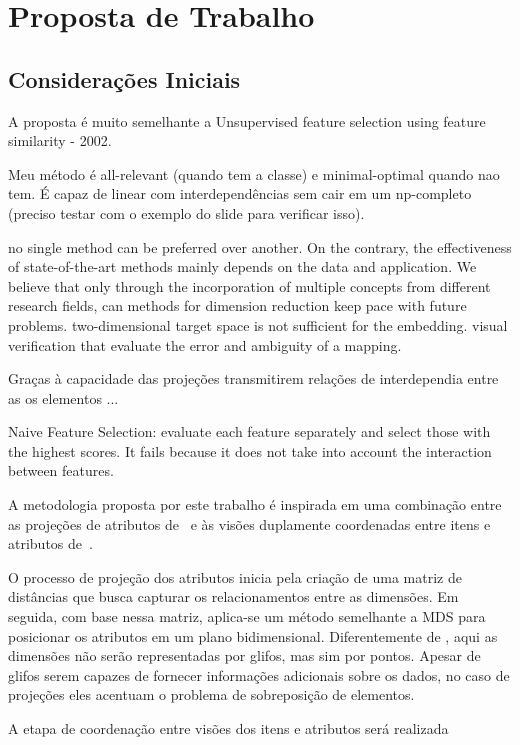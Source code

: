 \chapter{Proposta de Trabalho}\label{chap:proposta}

\section{Considerações Iniciais}

A proposta é muito semelhante a Unsupervised feature selection using feature similarity - 2002.

Meu método é all-relevant (quando tem a classe) e minimal-optimal quando nao tem. É capaz de linear com interdependências sem cair em um np-completo (preciso testar com o exemplo do slide para verificar isso).

\cite{Engel2012} no single method can be preferred over another. On the contrary, the effectiveness of state-of-the-art methods mainly depends on the data and application. 
We believe that only through the incorporation of multiple concepts from different research fields, can methods for dimension reduction keep pace with future problems. two-dimensional target space is not sufficient for the embedding. visual verification that evaluate the error and ambiguity of a mapping.

Graças à capacidade das projeções transmitirem relações de interdependia entre as os elementos ... 

Naive Feature Selection: evaluate each feature separately and select those with the highest scores. It fails because it does not take into account the interaction between features.

A metodologia proposta por este trabalho é inspirada em uma combinação entre as projeções de atributos de~\cite{Yang2004} e às visões duplamente coordenadas entre itens e atributos de~\cite{Turkay2011}. 

O processo de projeção dos atributos inicia pela criação de uma matriz de distâncias que busca capturar os relacionamentos entre as dimensões. Em seguida, com base nessa matriz, aplica-se um método semelhante a MDS para posicionar os atributos em um plano bidimensional. Diferentemente de \cite{Yang2004}, aqui as dimensões não serão representadas por glifos, mas sim por pontos. Apesar de glifos serem capazes de fornecer informações adicionais sobre os dados, no caso de projeções eles acentuam o problema de sobreposição de elementos.

A etapa de coordenação entre visões dos itens e atributos será realizada 


